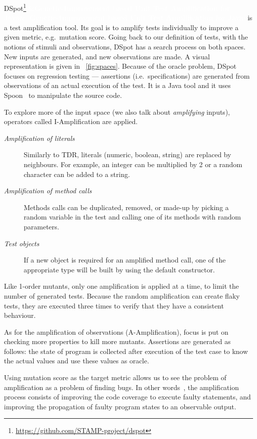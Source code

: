 \documentclass[11pt]{sdm_internship}
\newcommand{\addref}[1]{\colorbox{TealBlue!100}{\textcolor{white}{\textbf{$[$\ifx&#1&\ \else#1\fi$]$}}}}
\newcommand{\dspot}{DSpot\xspace}
\theoremstyle{definition}
\begin{document}
\dspot{}\footnote{\url{https://github.com/STAMP-project/dspot}}\addref{Genetic-Improvement based Unit Test Amplification for Java}\cite{baudry2015automatic,baudry2014tailored,baudry2015dspot} is a test amplification tool.
Its goal is to amplify tests individually to improve a given metric, e.g.\ mutation score.
Going back to our definition of tests, with the notions of stimuli and observations, \dspot{} has a search process on both spaces.
New inputs are generated, and new observations are made.
A visual representation is given in \figurename~\ref{fig:spaces}.
Because of the oracle problem, \dspot{} focuses on regression testing --- assertions (i.e.\ specifications) are generated from observations of an actual execution of the test.
It is a Java tool and it uses Spoon~\cite{pawlak2016spoon} to manipulate the source code.

To explore more of the input space (we also talk about \emph{amplifying} inputs), operators called I-Amplification are applied.
\begin{description}
  \item[\textit{Amplification of literals}] Similarly to TDR, literals (numeric, boolean, string) are replaced by neighbours. For example, an integer can be multiplied by 2 or a random character can be added to a string.
  \item[\textit{Amplification of method calls}] Methods calls can be duplicated, removed, or made-up by picking a random variable in the test and calling one of its methods with random parameters.
  \item[\textit{Test objects}] If a new object is required for an amplified method call, one of the appropriate type will be built by using the default constructor.
\end{description}
Like 1-order mutants, only one amplification is applied at a time, to limit the number of generated tests.
Because the random amplification can create flaky tests, they are executed three times to verify that they have a consistent behaviour.

As for the amplification of observations (A-Amplification), focus is put on checking more properties to kill more mutants.
Assertions are generated as follows: the state of program is collected after execution of the test case to know the actual values and use these values as oracle.

Using mutation score as the target metric allows us to see the problem of amplification as a problem of finding bugs.
In other words~\cite{shamshiri2015automatically}, the amplification process consists of improving the code coverage to execute faulty statements, and improving the propagation of faulty program states to an observable output.
\end{document}
